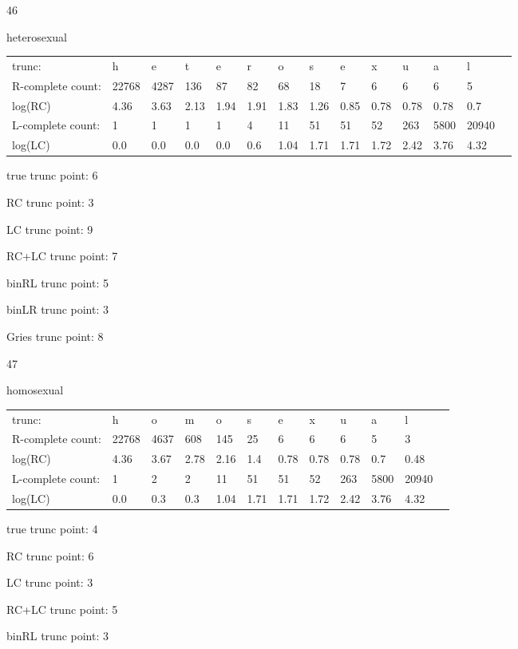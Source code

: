 \documentclass[10pt]{article}
\begin{document}
\vspace{1em}

46

heterosexual

\begin{tabular}{l|lllllllllllll}
trunc: & h & e & t & e & r & o & s & e & x & u & a & l & \\ 
R-complete count: & 22768 & 4287 & 136 & 87 & 82 & 68 & 18 & 7 & 6 & 6 & 6 & 5 & \\ 
log(RC) & 4.36 & 3.63 & 2.13 & 1.94 & 1.91 & 1.83 & 1.26 & 0.85 & 0.78 & 0.78 & 0.78 & 0.7 & \\ 
L-complete count: & 1 & 1 & 1 & 1 & 4 & 11 & 51 & 51 & 52 & 263 & 5800 & 20940 & \\ 
log(LC) & 0.0 & 0.0 & 0.0 & 0.0 & 0.6 & 1.04 & 1.71 & 1.71 & 1.72 & 2.42 & 3.76 & 4.32 & \\ 
\end{tabular}

true trunc point: 6

RC trunc point: 3

LC trunc point: 9

RC+LC trunc point: 7

binRL trunc point: 5

binLR trunc point: 3

Gries trunc point: 8

\vspace{1em}

47

homosexual

\begin{tabular}{l|lllllllllll}
trunc: & h & o & m & o & s & e & x & u & a & l & \\ 
R-complete count: & 22768 & 4637 & 608 & 145 & 25 & 6 & 6 & 6 & 5 & 3 & \\ 
log(RC) & 4.36 & 3.67 & 2.78 & 2.16 & 1.4 & 0.78 & 0.78 & 0.78 & 0.7 & 0.48 & \\ 
L-complete count: & 1 & 2 & 2 & 11 & 51 & 51 & 52 & 263 & 5800 & 20940 & \\ 
log(LC) & 0.0 & 0.3 & 0.3 & 1.04 & 1.71 & 1.71 & 1.72 & 2.42 & 3.76 & 4.32 & \\ 
\end{tabular}

true trunc point: 4

RC trunc point: 6

LC trunc point: 3

RC+LC trunc point: 5

binRL trunc point: 3
\end{document}
